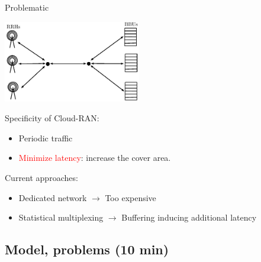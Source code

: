 \documentclass[10 pt]{beamer}
\begin{document}
\begin{frame}{Problematic}
  \centering
  
  \begin{center}
  \includegraphics [width=6cm]{modelstar} 
\end{center}

 \begin{multicols}{2}
Specificity of Cloud-RAN:

\begin{itemize}
  \item Periodic traffic 
\item \textcolor{red}{Minimize latency}: increase the cover area.


\end{itemize}
\vspace{2cm}
Current approaches: \begin{itemize}

\item Dedicated network $\rightarrow$ Too expensive
\item Statistical multiplexing $\rightarrow$ Buffering inducing additional latency
\end{itemize}
\end{multicols}

\end{frame}


\subsection{Model, problems (10 min)}
 
\end{document}
